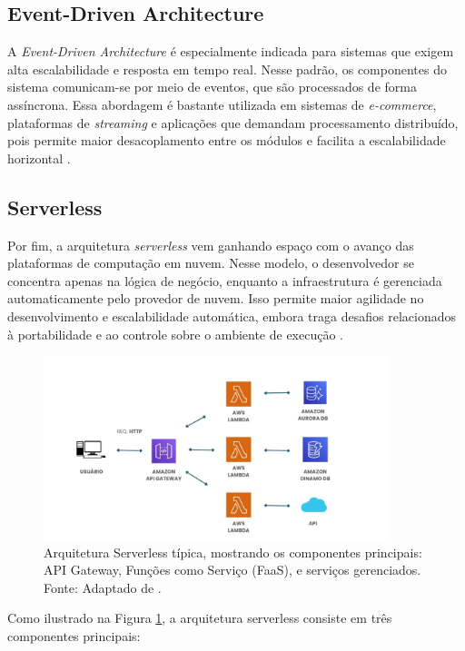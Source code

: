 \subsection{Event-Driven Architecture}
A \textit{Event-Driven Architecture} é especialmente indicada para sistemas que exigem alta escalabilidade e resposta em tempo real. Nesse padrão, os componentes do sistema comunicam-se por meio de eventos, que são processados de forma assíncrona. Essa abordagem é bastante utilizada em sistemas de \textit{e-commerce}, plataformas de \textit{streaming} e aplicações que demandam processamento distribuído, pois permite maior desacoplamento entre os módulos e facilita a escalabilidade horizontal \cite{jamshidi2016systematic}. 

\subsection{Serverless}
Por fim, a arquitetura \textit{serverless} vem ganhando espaço com o avanço das plataformas de computação em nuvem. Nesse modelo, o desenvolvedor se concentra apenas na lógica de negócio, enquanto a infraestrutura é gerenciada automaticamente pelo provedor de nuvem. Isso permite maior agilidade no desenvolvimento e escalabilidade automática, embora traga desafios relacionados à portabilidade e ao controle sobre o ambiente de execução \cite{shekhar2023microservices}.

\begin{figure}[h]
\centering
\includegraphics[width=0.9\textwidth]{images/serverless.png}
\caption{Arquitetura Serverless típica, mostrando os componentes principais: API Gateway, Funções como Serviço (FaaS), e serviços gerenciados. Fonte: Adaptado de \cite{shekhar2023microservices}.}
\label{fig:serverless}
\end{figure}

Como ilustrado na Figura \ref{fig:serverless}, a arquitetura serverless consiste em três componentes principais:

